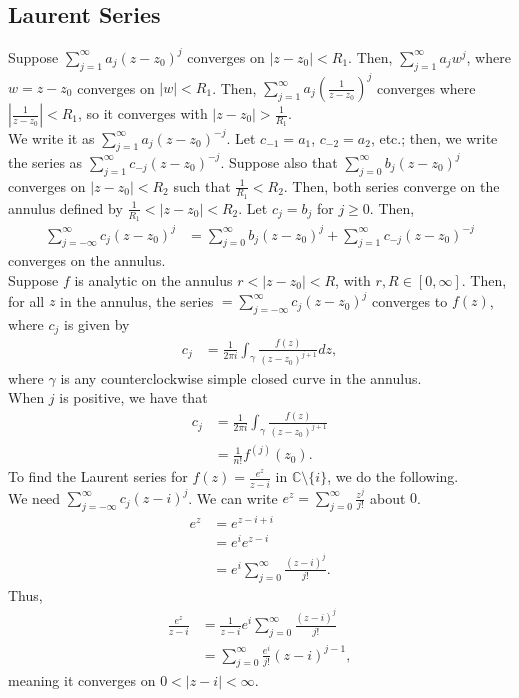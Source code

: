\documentclass[10pt]{extarticle}
\newcommand{\C}{\mathbb{C}}
\begin{document}
  \subsection{Laurent Series}%
  Suppose $\sum_{j=1}^{\infty}a_j(z-z_0)^j$ converges on $|z-z_0| < R_1$. Then, $\sum_{j=1}^{\infty}a_jw^j$, where $w = z-z_0$ converges on $|w|< R_1$. Then, $\sum_{j=1}^{\infty}a_j \left(\frac{1}{z-z_0}\right)^{j}$ converges where $\left|\frac{1}{z-z_0}\right| < R_1$, so it converges with $|z-z_0| > \frac{1}{R_1}$.\\

  We write it as $\sum_{j=1}^{\infty}a_j(z-z_0)^{-j}$. Let $c_{-1} = a_1$, $c_{-2} = a_2$, etc.; then, we write the series as $\sum_{j=1}^{\infty}c_{-j}(z-z_0)^{-j}$. Suppose also that $\sum_{j=0}^{\infty}b_j(z-z_0)^j$ converges on $|z-z_0| < R_2$ such that $\frac{1}{R_1} < R_2$. Then, both series converge on the annulus defined by $ \frac{1}{R_1} < |z-z_0| < R_2$. Let $c_j = b_j$ for $j \geq 0$. Then,
  \begin{align*}
    \sum_{j=-\infty}^{\infty}c_j(z-z_0)^j &= \sum_{j=0}^{\infty}b_j(z-z_0)^j + \sum_{j=1}^{\infty}c_{-j}(z-z_0)^{-j}
  \end{align*}
  converges on the annulus.\\

  Suppose $f$ is analytic on the annulus $r < |z-z_0| < R$, with $r,R \in [0,\infty]$. Then, for all $z$ in the annulus, the series $= \sum_{j=-\infty}^{\infty}c_j(z-z_0)^j$ converges to $f(z)$, where $c_j$ is given by
  \begin{align*}
    c_j &= \frac{1}{2\pi i}\int_{\gamma}\frac{f(z)}{\left(z-z_0\right)^{j+1}}dz,
  \end{align*}
  where $\gamma$ is any counterclockwise simple closed curve in the annulus.\\

  When $j$ is positive, we have that
  \begin{align*}
    c_j &= \frac{1}{2\pi i}\int_{\gamma}\frac{f(z)}{(z-z_0)^{j+1}}\\
        &= \frac{1}{n!}f^{(j)}(z_0).
  \end{align*}
  To find the Laurent series for $f(z) = \frac{e^z}{z-i}$ in $\C\setminus \{i\}$, we do the following.\\

  We need $\sum_{j=-\infty}^{\infty}c_j(z-i)^j$. We can write $e^z = \sum_{j=0}^{\infty}\frac{z^j}{j!}$ about $0$.
  \begin{align*}
    e^z &= e^{z-i+i}\\
        &= e^ie^{z-i}\\
        &= e^{i}\sum_{j=0}^{\infty}\frac{(z-i)^j}{j!}.
  \end{align*}
  Thus,
  \begin{align*}
    \frac{e^z}{z-i} &= \frac{1}{z-i}e^i\sum_{j=0}^{\infty}\frac{(z-i)^j}{j!}\\
                    &= \sum_{j=0}^{\infty}\frac{e^i}{j!}(z-i)^{j-1},
  \end{align*}
  meaning it converges on $0 < |z-i| < \infty$.\\
\end{document}

